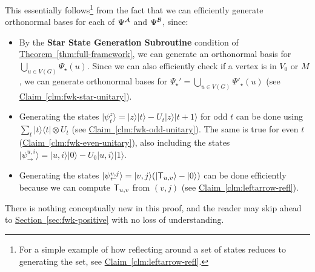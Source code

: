 \documentclass{theoretics}
\renewcommand{\sec}[1]{\hyperref[sec:#1]{Section~\ref*{sec:#1}}}
\newcommand{\thm}[1]{\hyperref[thm:#1]{Theorem~\ref*{thm:#1}}}
\newcommand{\clm}[1]{\hyperref[clm:#1]{Claim~\ref*{clm:#1}}}
\def\ket#1{{\lvert}#1\rangle}
\def\bra#1{{\langle}#1\rvert}
\renewcommand{\>}{\rangle}
\newcommand{\<}{\langle}
\renewcommand{\(}{\left(}
\renewcommand{\)}{\right)}
\begin{document}
\noindent This essentially follows\footnote{For a simple example of how reflecting around a set of states reduces to generating the set, see \clm{leftarrow-refl}.} from the fact that we can efficiently generate orthonormal bases for each of $\Psi^{\cal A}$ and $\Psi^{\cal B}$, since:
\begin{itemize}
\item By the \textbf{Star State Generation Subroutine} condition of \thm{full-framework}, we can generate an orthonormal basis for $\bigcup_{u\in V(G)}\Psi_\star(u)$. Since we can also efficiently check if a vertex is in $V_0$ or $M$, we can generate orthonormal bases for $\Psi_\star'=\bigcup_{u\in V(G)}\Psi'_\star(u)$ (see \clm{fwk-star-unitary}).
\item Generating the states $\ket{\psi_t^z}=\ket{z}\ket{t}-U_t\ket{z}\ket{t+1}$ for odd $t$ can be done using $\sum_{t}\ket{t}\bra{t}\otimes U_t$ (see \clm{fwk-odd-unitary}). The same is true for even $t$ (\clm{fwk-even-unitary}), also including the states $\ket{\psi_{\rightarrow}^{u,i}}=\ket{u,i}\ket{0}-U_0\ket{u,i}\ket{1}$.
\item Generating the states $\ket{\psi_{\leftarrow}^{v,j}}=\ket{v,j}(\ket{{\sf T}_{u,v}}-\ket{0})$ can be done efficiently because we can compute ${\sf T}_{u,v}$ from $(v,j)$ (see \clm{leftarrow-refl}). 
\end{itemize}
There is nothing conceptually new in this proof, and the reader may skip ahead to \sec{fwk-positive} with no loss of understanding. 
\end{document}
